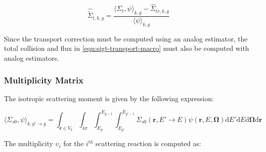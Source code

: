 \begin{equation}
\label{eqn:sigt-transport-macro}
\hat{\tilde{\Sigma}}_{t,k,g} = \frac{\langle \Sigma_{t}, \psi \rangle_{k,g} - \hat{\Sigma}_{tr,k,g}}{\langle \psi \rangle_{k,g}}
\end{equation}

Since the transport correction must be computed using an analog estimator, the total collision and flux in \autoref{eqn:sigt-transport-macro} must also be computed with analog estimators.

\subsubsection{Multiplicity Matrix}
\label{subsubsec:tally-types-mult-mat}

The isotropic scattering moment is given by the following expression:

\begin{equation}
\label{eqn:sigs0}
\langle \Sigma_{s0}, \psi \rangle_{k,g'\rightarrow g} = \int_{\mathbf{r} \in V_{k}} \int_{4\pi} \int_{E_{g}}^{E_{g-1}} \int_{E_{g'}}^{E_{g'-1}} \Sigma_{s0}(\mathbf{r},E'\rightarrow E)\psi(\mathbf{r},E,\mathbf{\Omega}) \mathrm{d}E'\mathrm{d}E\mathrm{d}\mathbf{\Omega}\mathrm{d}\mathbf{r}
\end{equation}

The multiplicity $\upsilon_i$ for the $i^{th}$ scattering reaction is computed as:

%
%

